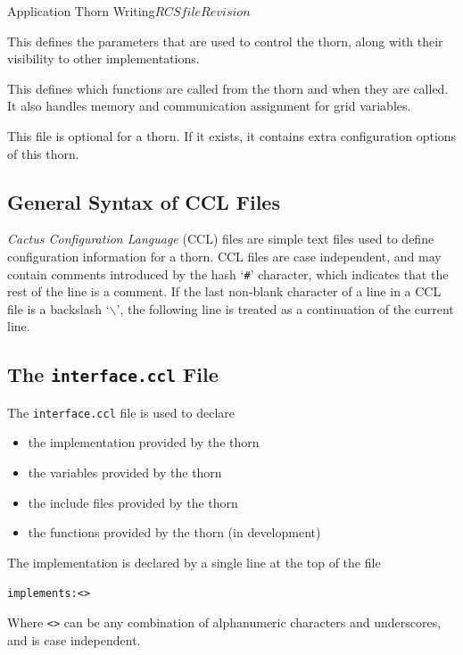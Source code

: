 \begin{cactuspart}{Application Thorn Writing}{$RCSfile$}{$Revision$}
\begin{Lentry}
\item [\texttt{param.ccl}]
This defines the parameters that are used to control the thorn, along
with their visibility to other implementations.

\item [\texttt{schedule.ccl}]
This defines which functions are called from the thorn and when they are
called. It also handles memory and communication assignment for grid variables.

\item [\texttt{configuration.ccl}]
This file is optional for a thorn. If it exists, it contains extra
configuration options of this thorn.

\end{Lentry}

\subsection{General Syntax of CCL Files}

\textit{Cactus Configuration Language} (CCL) files are simple text files
used to define configuration information for a thorn.  CCL files are
case independent, and may contain comments introduced by the hash `\texttt{\#}'
character, which indicates that the rest of the line is a comment. If the last
non-blank character of a line in a CCL file is a backslash
`\texttt{$\backslash$}', the
following line is treated as a continuation of the current line.

\subsection{The \texttt{interface.ccl} File}
\label{subsec:interface_ccl}

The \texttt{interface.ccl} file is used to declare

\begin{itemize}
\item the implementation provided by the thorn
\item the variables provided by the thorn
\item the include files provided by the thorn
\item the functions provided by the thorn (in development)
\end{itemize}


The implementation is declared by a single line at the top of the file
\begin{alltt}
implements: <>
\end{alltt}
Where \texttt{<>} can be any combination of alphanumeric
characters and underscores, and is case independent.


\end{cactuspart}
